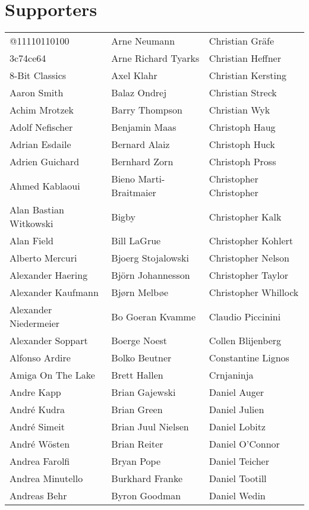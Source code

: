 \newpage
\section{Supporters}

\setlength{\tabcolsep}{1mm}
\begin{tabular}{p{4.5cm}p{4.5cm}p{4.5cm}}
@11110110100 & Arne Neumann & Christian Gräfe \\
3c74ce64 & Arne Richard Tyarks & Christian Heffner \\
8-Bit Classics & Axel Klahr & Christian Kersting \\
Aaron Smith & Balaz Ondrej & Christian Streck \\
Achim Mrotzek & Barry Thompson & Christian Wyk \\
Adolf Nefischer & Benjamin Maas & Christoph Haug \\
Adrian Esdaile & Bernard Alaiz & Christoph Huck \\
Adrien Guichard & Bernhard Zorn & Christoph Pross \\
Ahmed Kablaoui & Bieno Marti-Braitmaier & Christopher Christopher \\
Alan Bastian Witkowski & Bigby & Christopher Kalk \\
Alan Field & Bill LaGrue & Christopher Kohlert \\
Alberto Mercuri & Bjoerg Stojalowski & Christopher Nelson \\
Alexander Haering & Björn Johannesson & Christopher Taylor \\
Alexander Kaufmann & Bjørn Melbøe & Christopher Whillock \\
Alexander Niedermeier & Bo Goeran Kvamme & Claudio Piccinini \\
Alexander Soppart & Boerge Noest & Collen Blijenberg \\
Alfonso Ardire & Bolko Beutner & Constantine Lignos \\
Amiga On The Lake & Brett Hallen & Crnjaninja \\
Andre Kapp & Brian Gajewski & Daniel Auger \\
André Kudra & Brian Green & Daniel Julien \\
André Simeit & Brian Juul Nielsen & Daniel Lobitz \\
André Wösten & Brian Reiter & Daniel O'Connor \\
Andrea Farolfi & Bryan Pope & Daniel Teicher \\
Andrea Minutello & Burkhard Franke & Daniel Tootill \\
Andreas Behr & Byron Goodman & Daniel Wedin \\

\end{tabular}
